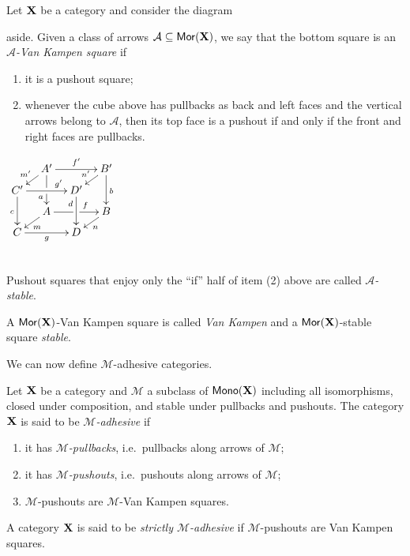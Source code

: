 \documentclass[runningheads,envcountsect]{llncs}
\def\C{\textbf {\textup{C}}}
\def\X{\textbf {\textup{X}}}
\newcommand{\mor}{\mathsf{Mor}}
\newcommand{\mon}{\mathsf{Mono}}
\begin{document}
\begin{definition}
	Let $\X$ be a category and consider the diagram\\
	\parbox{10cm}{
		aside.
		Given  a class of arrows $\mathcal{A}\subseteq \mor(\X)$, we say that the bottom square
		is an \emph{$\mathcal{A}$-Van Kampen square} if
		\begin{enumerate}
			\item it is a pushout square;
			\item 	whenever the cube above has pullbacks as back and left faces and the vertical arrows belong to $\mathcal{A}$, then its top face is a pushout 
			if and only if the front and right faces are pullbacks.
	\end{enumerate}}
	\parbox{2cm}{$\xymatrix@C=10pt@R=6pt{&A'\ar[dd]|\hole_(.65){a}\ar[rr]^{f'} \ar[dl]_{m'} && B' \ar[dd]^{b} \ar[dl]_{n'} \\ C'  \ar[dd]_{c}\ar[rr]^(.7){g'} & & D' \ar[dd]_(.3){d}\\&A\ar[rr]|\hole^(.65){f} \ar[dl]^{m} && B \ar[dl]^{n} \\C \ar[rr]_{g} & & D }$ }\\
	Pushout squares that enjoy only the ``if'' half of item (2) above are called \emph{$\mathcal{A}$-stable}.
	
	A $\mor(\X)$-Van Kampen square is called  \emph{Van
		Kampen} and a $\mor(\X)$-stable square  \emph{stable}.
\end{definition}

We can now define $\mathcal{M}$-adhesive categories.

\begin{definition}
	Let $\X$ be a category and $\mathcal{M}$ a subclass of
	$\mon(\X)$  including  all isomorphisms, closed under composition,  and stable under pullbacks and pushouts.  The category  $\X$ is said to be \emph{$\mathcal{M}$-adhesive} if
	\begin{enumerate}
		\item it has \emph{$\mathcal{M}$-pullbacks}, i.e.~pullbacks along arrows of $\mathcal{M}$;
		\item it has \emph{$\mathcal{M}$-pushouts}, i.e.~pushouts along arrows of $\mathcal{M}$;
		\item  $\mathcal{M}$-pushouts are $\mathcal{M}$-Van Kampen squares.
	\end{enumerate}
	
	A category $\X$ is said to be \emph{strictly $\mathcal{M}$-adhesive}
	if $\mathcal{M}$-pushouts are Van Kampen squares.
\end{definition}
\end{document}
